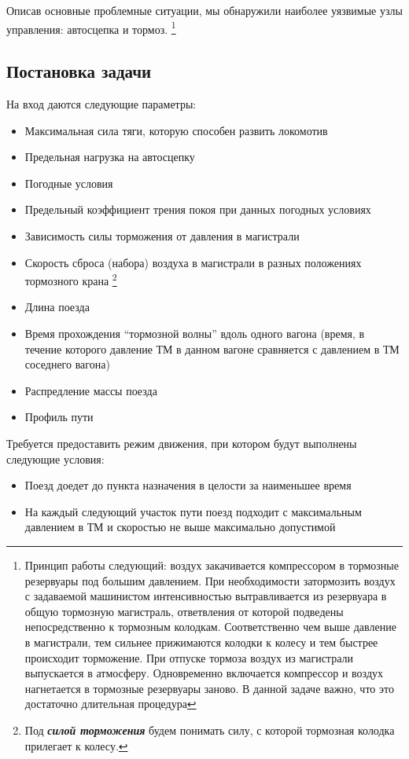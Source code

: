 Описав основные проблемные ситуации, мы обнаружили наиболее уязвимые узлы управления: автосцепка и тормоз.
\footnote{ Принцип работы следующий: воздух закачивается компрессором в тормозные резервуары под большим давлением. При необходимости затормозить воздух с задаваемой машинистом интенсивностью вытравливается из резервуара в общую тормозную магистраль, ответвления от которой подведены непосредственно к тормозным колодкам. Соответственно чем выше давление в магистрали, тем сильнее прижимаются колодки к колесу и тем быстрее происходит торможение. При отпуске тормоза воздух из магистрали выпускается в атмосферу. Одновременно включается компрессор и воздух нагнетается в тормозные резервуары заново. В данной задаче важно, что это достаточно длительная процедура}

\subsection{Постановка задачи}
На вход даются следующие параметры:
\begin{itemize}
\item Максимальная сила тяги, которую способен развить локомотив
\item Предельная нагрузка на автосцепку
\item Погодные условия
\item Предельный коэффициент трения покоя при данных погодных условиях
\item Зависимость силы торможения от давления в магистрали
\item Скорость сброса (набора) воздуха в магистрали в разных положениях тормозного крана
\footnote{Под \textbf{\textit{силой торможения}} будем понимать силу, с которой тормозная колодка прилегает к колесу.}
\item Длина поезда
\item Время прохождения ``тормозной волны'' вдоль одного вагона (время, в течение которого давление ТМ в данном вагоне сравняется с давлением в ТМ соседнего вагона)
\item Распредление массы поезда
\item Профиль пути
\end{itemize}

Требуется предоставить режим движения, при котором будут выполнены следующие условия:
\begin{itemize}
\item Поезд доедет до пункта назначения в целости за наименьшее время
\item На каждый следующий участок пути поезд подходит с максимальным давлением в ТМ и скоростью не выше максимально допустимой
\end{itemize}


